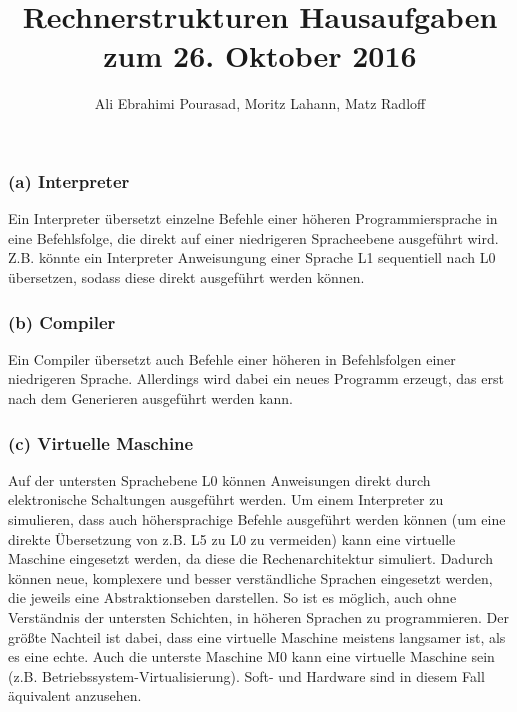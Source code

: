 \documentclass[11pt,a4paper]{article}
\title{\textbf{Rechnerstrukturen Hausaufgaben zum 26. Oktober 2016}}
\author{Ali Ebrahimi Pourasad, Moritz Lahann, Matz Radloff}
\begin{document}
  \maketitle
  \date{}
  \tableofcontents
  \newpage

\section{} %

\subsection{} %

\subsubsection{(a) Interpreter} %
Ein Interpreter übersetzt einzelne Befehle einer höheren Programmiersprache in eine Befehlsfolge, die direkt auf einer niedrigeren Spracheebene ausgeführt wird. Z.B. könnte ein Interpreter Anweisungung einer Sprache L1 sequentiell nach L0 übersetzen, sodass diese direkt ausgeführt werden können.

\subsubsection{(b) Compiler} %
Ein Compiler übersetzt auch Befehle einer höheren in Befehlsfolgen einer niedrigeren Sprache. Allerdings wird dabei ein neues Programm erzeugt, das erst nach dem Generieren ausgeführt werden kann.

\subsubsection{(c) Virtuelle Maschine} %
Auf der untersten Sprachebene L0 können Anweisungen direkt durch elektronische Schaltungen ausgeführt werden. Um einem Interpreter zu simulieren, dass auch höhersprachige Befehle ausgeführt werden können (um eine direkte Übersetzung von z.B. L5 zu L0 zu vermeiden) kann eine virtuelle Maschine eingesetzt werden, da diese die Rechenarchitektur simuliert.
Dadurch können neue, komplexere und besser verständliche Sprachen eingesetzt werden, die jeweils eine Abstraktionseben darstellen. So ist es möglich, auch ohne Verständnis der untersten Schichten, in höheren Sprachen zu programmieren. Der größte Nachteil ist dabei, dass eine virtuelle Maschine meistens langsamer ist, als es eine echte. Auch die unterste Maschine M0 kann eine virtuelle Maschine sein (z.B. Betriebssystem-Virtualisierung). Soft- und Hardware sind in diesem Fall äquivalent anzusehen.
\end{document}
